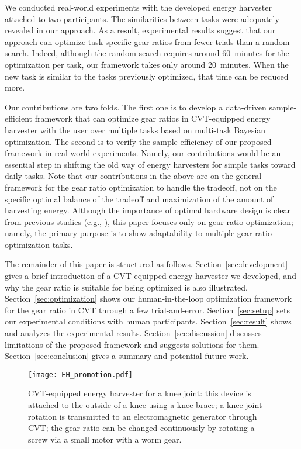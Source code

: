 \documentclass[twocolumn]{svjour3}          %
\begin{document}
We conducted real-world experiments with the developed energy harvester attached to two participants.
The similarities between tasks were adequately revealed in our approach.
As a result, experimental results suggest that our approach can optimize task-specific gear ratios from fewer trials than a random search.
Indeed, although the random search requires around 60~minutes for the optimization per task, our framework takes only around 20~minutes.
When the new task is similar to the tasks previously optimized, that time can be reduced more.

Our contributions are two folds.
The first one is to develop a data-driven sample-efficient framework that can optimize gear ratios in CVT-equipped energy harvester with the user over multiple tasks based on multi-task Bayesian optimization.
The second is to verify the sample-efficiency of our proposed framework in real-world experiments.
Namely, our contributions would be an essential step in shifting the old way of energy harvesters for simple tasks toward daily tasks.
Note that our contributions in the above are on the general framework for the gear ratio optimization to handle the tradeoff, not on the specific optimal balance of the tradeoff and maximization of the amount of harvesting energy.
Although the importance of optimal hardware design is clear from previous studies (e.g., \cite{jhalani2012optimal}),
this paper focuses only on gear ratio optimization; namely, the primary purpose is to show adaptability to multiple gear ratio optimization tasks.

The remainder of this paper is structured as follows.
Section~\ref{sec:development} gives a brief introduction of a CVT-equipped energy harvester we developed, and why the gear ratio is suitable for being optimized is also illustrated.
Section~\ref{sec:optimization} shows our human-in-the-loop optimization framework for the gear ratio in CVT through a few trial-and-error.
Section~\ref{sec:setup} sets our experimental conditions with human participants.
Section~\ref{sec:result} shows and analyzes the experimental results.
Section~\ref{sec:discussion} discusses limitations of the proposed framework and suggests solutions for them.
Section~\ref{sec:conclusion} gives a summary and potential future work.

\begin{figure}[tb]
    \centering
    \texttt{[image: EH\_promotion.pdf]}
    \caption{CVT-equipped energy harvester for a knee joint:
    this device is attached to the outside of a knee using a knee brace;
    a knee joint rotation is transmitted to an electromagnetic generator through CVT;
    the gear ratio can be changed continuously by rotating a screw via a small motor with a worm gear.
    }
    \label{fig:EH_promotion}
\end{figure}
\end{document}
